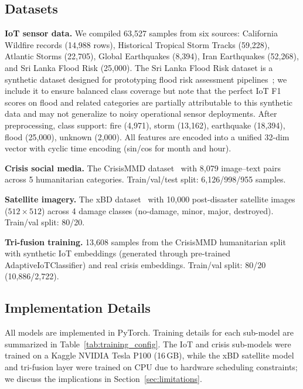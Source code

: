 \documentclass[journal]{IEEEtran}
\begin{document}
\subsection{Datasets}

\textbf{IoT sensor data.} We compiled 63,527 samples from six sources: California Wildfire records (14,988 rows), Historical Tropical Storm Tracks (59,228), Atlantic Storms (22,705), Global Earthquakes (8,394), Iran Earthquakes (52,268), and Sri Lanka Flood Risk (25,000). The Sri Lanka Flood Risk dataset is a synthetic dataset designed for prototyping flood risk assessment pipelines~\cite{srilanka_flood}; we include it to ensure balanced class coverage but note that the perfect IoT F1 scores on flood and related categories are partially attributable to this synthetic data and may not generalize to noisy operational sensor deployments. After preprocessing, class support: fire (4,971), storm (13,162), earthquake (18,394), flood (25,000), unknown (2,000). All features are encoded into a unified 32-dim vector with cyclic time encoding (sin/cos for month and hour).

\textbf{Crisis social media.} The CrisisMMD dataset~\cite{alam2018crisismmd} with 8,079 image--text pairs across 5 humanitarian categories. Train/val/test split: 6,126/998/955 samples.

\textbf{Satellite imagery.} The xBD dataset~\cite{gupta2019xbd} with 10,000 post-disaster satellite images ($512 \times 512$) across 4 damage classes (no-damage, minor, major, destroyed). Train/val split: 80/20.

\textbf{Tri-fusion training.} 13,608 samples from the CrisisMMD humanitarian split with synthetic IoT embeddings (generated through pre-trained AdaptiveIoTClassifier) and real crisis embeddings. Train/val split: 80/20 (10,886/2,722).

\subsection{Implementation Details}

All models are implemented in PyTorch. Training details for each sub-model are summarized in Table~\ref{tab:training_config}. The IoT and crisis sub-models were trained on a Kaggle NVIDIA Tesla P100 (16\,GB), while the xBD satellite model and tri-fusion layer were trained on CPU due to hardware scheduling constraints; we discuss the implications in Section~\ref{sec:limitations}.
\end{document}
